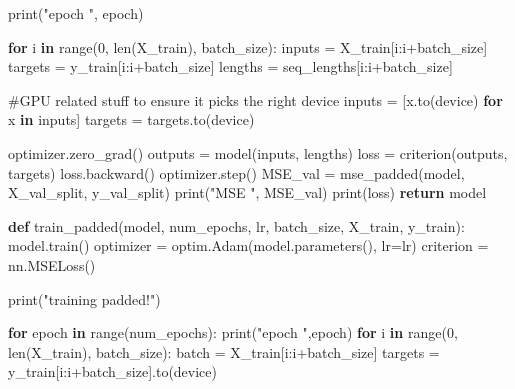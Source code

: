 \documentclass[
  letterpaper,
  DIV=11,
  numbers=noendperiod]{scrartcl}
\newenvironment{Shaded}{\begin{snugshade}}{\end{snugshade}}
\newcommand{\BuiltInTok}[1]{\textcolor[rgb]{0.00,0.23,0.31}{#1}}
\newcommand{\CommentTok}[1]{\textcolor[rgb]{0.37,0.37,0.37}{#1}}
\newcommand{\ControlFlowTok}[1]{\textcolor[rgb]{0.00,0.23,0.31}{\textbf{#1}}}
\newcommand{\DecValTok}[1]{\textcolor[rgb]{0.68,0.00,0.00}{#1}}
\newcommand{\KeywordTok}[1]{\textcolor[rgb]{0.00,0.23,0.31}{\textbf{#1}}}
\newcommand{\NormalTok}[1]{\textcolor[rgb]{0.00,0.23,0.31}{#1}}
\newcommand{\OperatorTok}[1]{\textcolor[rgb]{0.37,0.37,0.37}{#1}}
\newcommand{\StringTok}[1]{\textcolor[rgb]{0.13,0.47,0.30}{#1}}
\begin{document}
\begin{Shaded}
\begin{Highlighting}[]
        \BuiltInTok{print}\NormalTok{(}\StringTok{"epoch "}\NormalTok{, epoch)}

        \ControlFlowTok{for}\NormalTok{ i }\KeywordTok{in} \BuiltInTok{range}\NormalTok{(}\DecValTok{0}\NormalTok{, }\BuiltInTok{len}\NormalTok{(X\_train), batch\_size):}
\NormalTok{            inputs }\OperatorTok{=}\NormalTok{ X\_train[i:i}\OperatorTok{+}\NormalTok{batch\_size]}
\NormalTok{            targets }\OperatorTok{=}\NormalTok{ y\_train[i:i}\OperatorTok{+}\NormalTok{batch\_size]}
\NormalTok{            lengths }\OperatorTok{=}\NormalTok{ seq\_lengths[i:i}\OperatorTok{+}\NormalTok{batch\_size]}

            \CommentTok{\#GPU related stuff to ensure it picks the right device}
\NormalTok{            inputs  }\OperatorTok{=}\NormalTok{ [x.to(device) }\ControlFlowTok{for}\NormalTok{ x }\KeywordTok{in}\NormalTok{ inputs]}
\NormalTok{            targets }\OperatorTok{=}\NormalTok{ targets.to(device)}

\NormalTok{            optimizer.zero\_grad()}
\NormalTok{            outputs }\OperatorTok{=}\NormalTok{ model(inputs, lengths)}
\NormalTok{            loss }\OperatorTok{=}\NormalTok{ criterion(outputs, targets)}
\NormalTok{            loss.backward()}
\NormalTok{            optimizer.step()}
\NormalTok{        MSE\_val }\OperatorTok{=}\NormalTok{ mse\_padded(model, X\_val\_split, y\_val\_split)}
        \BuiltInTok{print}\NormalTok{(}\StringTok{"MSE "}\NormalTok{, MSE\_val)}
        \BuiltInTok{print}\NormalTok{(loss)}
    \ControlFlowTok{return}\NormalTok{ model}

\KeywordTok{def}\NormalTok{ train\_padded(model, num\_epochs, lr, batch\_size, X\_train, y\_train):}
\NormalTok{    model.train()}
\NormalTok{    optimizer }\OperatorTok{=}\NormalTok{ optim.Adam(model.parameters(), lr}\OperatorTok{=}\NormalTok{lr)}
\NormalTok{    criterion }\OperatorTok{=}\NormalTok{ nn.MSELoss()}

    \BuiltInTok{print}\NormalTok{(}\StringTok{"training padded!"}\NormalTok{)}

    \ControlFlowTok{for}\NormalTok{ epoch }\KeywordTok{in} \BuiltInTok{range}\NormalTok{(num\_epochs):}
        \BuiltInTok{print}\NormalTok{(}\StringTok{"epoch "}\NormalTok{,epoch)}
        \ControlFlowTok{for}\NormalTok{ i }\KeywordTok{in} \BuiltInTok{range}\NormalTok{(}\DecValTok{0}\NormalTok{, }\BuiltInTok{len}\NormalTok{(X\_train), batch\_size):}
\NormalTok{            batch }\OperatorTok{=}\NormalTok{ X\_train[i:i}\OperatorTok{+}\NormalTok{batch\_size]}
\NormalTok{            targets }\OperatorTok{=}\NormalTok{ y\_train[i:i}\OperatorTok{+}\NormalTok{batch\_size].to(device)}


\end{Highlighting}
\end{Shaded}
\end{document}
